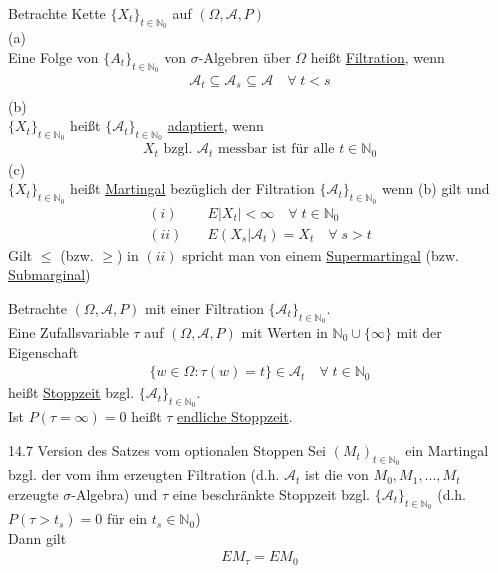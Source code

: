 \documentclass[a4paper,openany]{book}
\theoremstyle{mytheoremstyle}
\theoremstyle{mytheoremstyle2}
\begin{document}
\begin{defi}{14.5}{}
  Betrachte Kette $\{X_t\}_{t \in \mathbb{N}_0}$ auf $(\Omega ,\mathcal{A},P)$ \\
  (a)\\
  Eine Folge von $\{A_t\}_{t \in \mathbb{N}_0}$ von $\sigma $-Algebren über $\Omega $ heißt \underline{Filtration}, wenn 
  \begin{align*}
    \underset{}{\mathcal{A}_t \subseteq \mathcal{A}_s}_{} \subseteq \mathcal{A}\quad \forall\;t<s
  \end{align*}
  (b)\\
  $\{X_t\}_{t \in \mathbb{N}_0} $ heißt $\{\mathcal{A}_t\}_{t \in \mathbb{N}_0}$ \underline{adaptiert}, wenn 
  \begin{align*}
    X_t \text{ bzgl. } \mathcal{A}_t \text{ messbar ist für alle }t \in \mathbb{N}_0
  \end{align*}
  (c) \\
  $\{X_t\}_{t \in \mathbb{N}_0}$ heißt \underline{Martingal} bezüglich der Filtration $\{\mathcal{A}_t\}_{t \in \mathbb{N}_0}$ wenn (b) gilt und
  \begin{align*}
    (i)&\quad E|X_t|<\infty \quad \forall\;t \in \mathbb{N}_0 \\
    (ii)&\quad E(X_s|\mathcal{A}_t)=X_t\quad \forall\;s>t
  \end{align*}
  Gilt $\leq $ (bzw. $\geq $) in $(ii)$ spricht man von einem \underline{Supermartingal} (bzw. \underline{Submarginal})  
\end{defi}
\begin{defi}{14.6}{}
  Betrachte $(\Omega ,\mathcal{A},P)$ mit einer Filtration $\{\mathcal{A}_t\}_{t \in \mathbb{N}_0}$. \\
  Eine Zufallsvariable $\tau$ auf $(\Omega ,\mathcal{A},P)$ mit Werten in $\mathbb{N}_0 \cup \{\infty \} $ mit der Eigenschaft 
  \begin{align*}
    \{w \in \Omega :\tau(w)=t\}\in \mathcal{A}_t\quad \forall\;t \in \mathbb{N}_0
  \end{align*}
  heißt \underline{Stoppzeit} bzgl. $\{\mathcal{A}_t\}_{t \in \mathbb{N}_0}$. \\
  Ist $P(\tau = \infty )=0$ heißt $\tau $ \underline{endliche Stoppzeit}. 
\end{defi}
\begin{theo}{14.7 Version des Satzes vom optionalen Stoppen}{}
  Sei $(M_t)_{t \in \mathbb{N}_0}$ ein Martingal bzgl. der vom ihm erzeugten Filtration (d.h. $\mathcal{A}_t$ ist die von $M_0,M_1,...,M_t$ erzeugte $\sigma $-Algebra) und $\tau$ eine beschränkte Stoppzeit bzgl. $\{\mathcal{A}_t\}_{t \in \mathbb{N}_0}$ (d.h. $P(\tau>t_s)=0$ für ein $t_s \in \mathbb{N}_0$)\\
  Dann gilt 
  \begin{align*}
    E M _{\tau}=EM_0
  \end{align*}
\end{theo}
\end{document}
